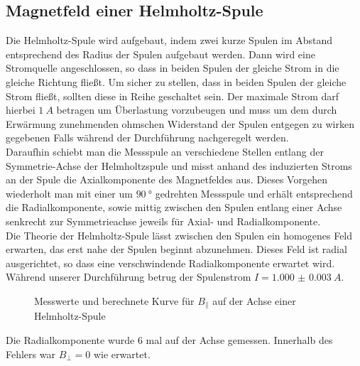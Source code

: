 \subsection{Magnetfeld einer Helmholtz-Spule}
Die Helmholtz-Spule wird aufgebaut, indem zwei kurze Spulen im Abstand entsprechend des Radius der Spulen aufgebaut werden. Dann wird eine Stromquelle angeschlossen, so dass in beiden Spulen der gleiche Strom in die gleiche Richtung fließt. Um sicher zu stellen, dass in beiden Spulen der gleiche Strom fließt, sollten diese in Reihe geschaltet sein. Der maximale Strom darf hierbei $ \SI{1}{A} $ betragen um Überlastung vorzubeugen und muss um dem durch Erwärmung zunehmenden ohmschen Widerstand der Spulen entgegen zu wirken gegebenen Falls während der Durchführung nachgeregelt werden. \\
Daraufhin schiebt man die Messspule an verschiedene Stellen entlang der Symmetrie-Achse der Helmholtzspule und misst anhand des induzierten Stroms an der Spule die Axialkomponente des Magnetfeldes aus. Dieses Vorgehen wiederholt man mit einer um $ \SI{90}{\degree} $ gedrehten Messspule und erhält entsprechend die Radialkomponente, sowie mittig zwischen den Spulen entlang einer Achse senkrecht zur Symmetrieachse jeweils für Axial- und Radialkomponente.\\
Die Theorie der Helmholtz-Spule lässt zwischen den Spulen ein homogenes Feld erwarten, das erst nahe der Spulen beginnt abzunehmen. Dieses Feld ist radial ausgerichtet, so dass eine verschwindende Radialkomponente erwartet wird. \\
Während unserer Durchführung betrug der Spulenstrom $ I= \SI{1.000(3)}{A} $.

\begin{figure}[H]
\centering
{}
\caption{Messwerte und berechnete Kurve für $B_\parallel$ auf der Achse einer Helmholtz-Spule}
\label{fig:axialaufachsehelm}
\end{figure}
Die Radialkomponente wurde 6 mal auf der Achse gemessen. Innerhalb des Fehlers war $B_\bot=0$ wie erwartet. 

